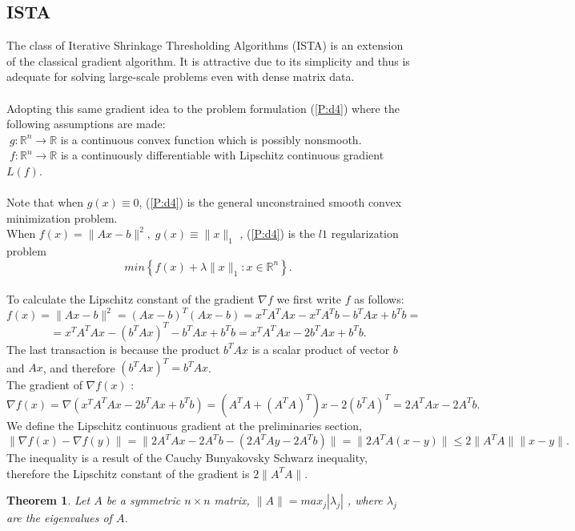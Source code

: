 \documentclass[12pt]{article}
\newtheorem{theorem}{Theorem}
\begin{document}
\subsection{ISTA}
The class of Iterative Shrinkage Thresholding Algorithms (ISTA) is an extension of the classical gradient algorithm. It is attractive due to its simplicity and thus is adequate for solving large-scale problems even with dense matrix data. \\
\\Adopting this same gradient idea to the problem formulation (\ref{P:d4}) where the following assumptions are made:\\
$ \;g: \mathbb{R}^n \rightarrow \mathbb{R}$ is a continuous convex function which is possibly nonsmooth.\\
$ \; f: \mathbb{R}^n \rightarrow \mathbb{R}$ is a continuously differentiable with Lipschitz continuous gradient $L(f)$.\\
\\Note that when $ g(x) \equiv0 $, (\ref{P:d4}) is the general unconstrained smooth convex minimization problem.\\
When $f(x) = \|Ax-b\|^2,\;g(x) \equiv \| x \|_1 $ , (\ref{P:d4}) is the $l1$ regularization problem
$$min\left\{f(x) + \lambda \|x\|_1 : x\in \mathbb{R}^n \right\}.$$
\\To calculate the Lipschitz constant of the gradient $\nabla f$ we first write $f$ as follows:
$$f(x) = \|Ax-b\|^2 = (Ax-b)^T (Ax-b)= x^T A^T Ax -x^T A^T b -b^T Ax +b^T b =$$
$$=x^T A^T Ax -(b^T Ax)^T -b^T Ax +b^T b= x^T A^T Ax -2b^T Ax +b^T b.$$
The last transaction is because the product $b^T Ax$ is a scalar product of vector $b$ and $Ax$, and therefore $(b^T Ax)^T=b^T Ax$.\\
The gradient of $\nabla f(x)$ :
$$\nabla f(x) = \nabla(x^T A^T Ax -2b^T Ax +b^T b)=(A^TA +(A^TA)^T)x-2(b^T A)^T =2A^TA x -2A^T b.$$
We define the Lipschitz continuous gradient at the preliminaries section, 
$$\| \nabla f(x) - \nabla f(y) \|= \| 2A^TA x -2A^T b-(2A^TA y -2A^T b)\| = \|2A^TA(x-y)\| \leq 2\|A^TA\| \|x-y\|.$$
The inequality is a result of the Cauchy Bunyakovsky Schwarz inequality, therefore the Lipschitz constant of the gradient is $2\|A^TA\|$. 
\begin{theorem}
Let $A$ be a symmetric $n\times n$ matrix, $\|A\|=max_j|\lambda_j|$ , where $\lambda_j$ are the eigenvalues of $A$.
\end{theorem}
\end{document}
